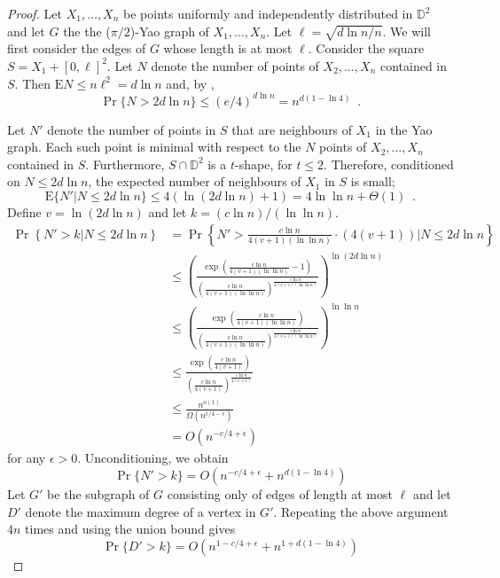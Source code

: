 \documentclass[lotsofwhite,charterfonts]{patmorin}
\newcommand{\D}{\mathbb{D}}
\newcommand{\PROB}{\Pr}
\newcommand{\EXP}{\mathrm{E}}
\begin{document}
\begin{proof}
Let $X_1,\ldots,X_n$ be points uniformly and independently distributed in
$\D^2$ and let $G$ the the ($\pi/2$)-Yao graph of $X_1,\ldots,X_n$.
Let $\ell=\sqrt{d\ln n/n}$.  We will first consider the edges of $G$ whose
length is at most $\ell$.  Consider the square $S=X_1+[0,\ell]^2$.  Let
$N$ denote the number of points of $X_2,\ldots,X_n$ contained in $S$.  Then
$\EXP{N} \le n\ell^2 = d\ln n$ and, by , 
\[
   \Pr\{N > 2d\ln n\} \le (e/4)^{d\ln n} = n^{d(1-\ln 4)} \enspace .
\]

Let $N'$ denote the number of points in $S$ that are neighbours of $X_1$
in the Yao graph.  Each such point is minimal with respect to the $N$
points of $X_2,\ldots,X_n$ contained in $S$.  Furthermore, $S\cap\D^2$
is a $t$-shape, for $t\le 2$.  Therefore, conditioned on $N \le 2d\ln n$,
the expected number of neighbours of $X_1$ in $S$ is small;
\[
   \EXP\{N'|N \le 2d\ln n\} 
        \le 4(\ln(2d\ln n) + 1) 
          = 4\ln\ln n + \Theta(1)\enspace .
\]
Define $v=\ln(2d\ln n)$ and
let $k=(c\ln n)/(\ln\ln n)$. 
\[
  \begin{aligned}
    \PROB\left\{N'> k|N\le 2d\ln n\right\}  
    & = \PROB\left\{N'> \frac{c\ln n}{4(v+1)(\ln\ln n)}\cdot(4(v+1)) |N\le 2d\ln n\right\} \\
    & \le\left
         (\frac{\exp\left(\frac{c\ln n}{4(v+1)(\ln\ln n)}-1\right)}
          {\left(\frac{c\ln n}{4(v+1)(\ln\ln n)}\right)^
           \frac{c\ln n}{4(v+1)(\ln\ln n)}}
         \right)^{\ln(2d\ln n)} \\
    & \le\left
         (\frac{\exp\left(\frac{c\ln n}{4(v+1)(\ln\ln n)}\right)}
          {\left(\frac{c\ln n}{4(v+1)(\ln\ln n)}\right)^
           \frac{c\ln n}{4(v+1)(\ln\ln n)}}
         \right)^{\ln\ln n} \\
    & \le
         \frac{\exp\left(\frac{c\ln n}{4(v+1)}\right)}
          {\left(\frac{c\ln n}{4(v+1)}\right)^{\frac{c\ln n}{4(v+1)}}}  \\
    & \le \frac{n^{o(1)}}{\Omega(n^{c/4-\epsilon})} \\
    & =  O(n^{-c/4 + \epsilon}) 
 \end{aligned} 
\]
for any $\epsilon > 0$.  Unconditioning, we obtain
\[
   \PROB\{N' > k\} = O(n^{-c/4+\epsilon} + n^{d(1-\ln 4)})
\]
Let $G'$ be the subgraph of $G$ consisting only of edges of length at most
$\ell$ and let $D'$ denote the maximum degree of a vertex in $G'$.
Repeating the above argument $4n$ times and using the union bound gives
\[
   \PROB\{D' > k\} = O(n^{1-c/4+\epsilon} + n^{1+d(1-\ln 4)})
\]


\end{proof}
\end{document}
